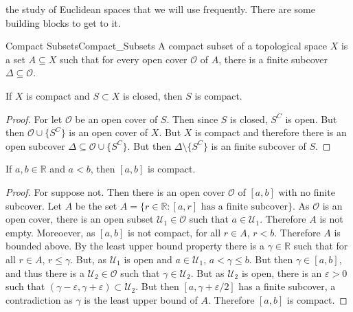             the study of Euclidean spaces that we will use frequently.
            There are some building blocks to get to it.
            \begin{ldefinition}{Compact Subsets}{Compact_Subsets}
                A compact subset of a topological space $X$ is a
                set $A\subseteq{X}$ such that for every open cover
                $\mathcal{O}$ of $A$, there is a finite subcover
                $\Delta\subseteq\mathcal{O}$.
            \end{ldefinition}
            \begin{theorem}
                If $X$ is compact and
                $S\subset{X}$ is closed, then
                $S$ is compact.
            \end{theorem}
            \begin{proof}
                For let $\mathcal{O}$ be an open cover
                of $S$. Then since $S$ is closed, $S^{C}$
                is open. But then $\mathcal{O}\cup\{S^{C}\}$ is an open
                cover of $X$. But $X$ is compact and therefore
                there is an open subcover
                $\Delta\subseteq\mathcal{O}\cup\{S^{C}\}$.
                But then $\Delta\setminus\{S^{C}\}$ is an finite
                subcover of $S$.
            \end{proof}
            \begin{theorem}
                If $a,b\in\mathbb{R}$ and $a<b$, then
                $[a,b]$ is compact.
            \end{theorem}
            \begin{proof}
                For suppose not. Then there is an open
                cover $\mathcal{O}$ of $[a,b]$ with no finite
                subcover. Let $A$ be the set
                $A=\{r\in\mathbb{R}:[a,r]%
                     \textrm{ has a finite subcover}\}$.
                As $\mathcal{O}$ is an open cover, there is
                an open subset $\mathcal{U}_{1}\in\mathcal{O}$ such
                that $a\in\mathcal{U}_{1}$. Therefore $A$ is
                not empty. Moreoever, as $[a,b]$ is not compact,
                for all $r\in{A}$, $r<b$. Therefore $A$ is bounded
                above. By the least upper bound property there
                is a $\gamma\in\mathbb{R}$ such that for
                all $r\in{A}$, $r\leq\gamma$. But, as
                $\mathcal{U}_{1}$ is open and $a\in\mathcal{U}_{1}$,
                $a<\gamma\leq{b}$. But then $\gamma\in[a,b]$, and
                thus there is a $\mathcal{U}_{2}\in\mathcal{O}$ such that
                $\gamma\in\mathcal{U}_{2}$. But as $\mathcal{U}_{2}$ is
                open, there is an $\varepsilon>0$ such that
                $(\gamma-\varepsilon,\gamma+\varepsilon)\subset\mathcal{U}_{2}$.
                But then $[a,\gamma+\varepsilon/2]$ has a finite subcover,
                a contradiction as $\gamma$ is the least upper bound
                of $A$. Therefore $[a,b]$ is compact.
            \end{proof}
